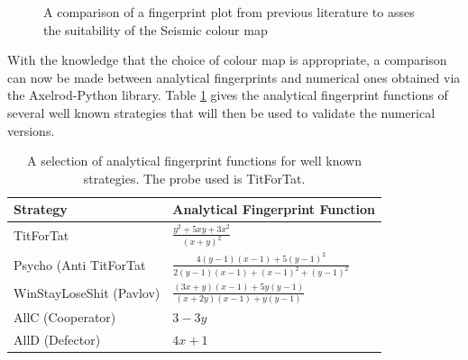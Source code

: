 \begin{figure}[hbtp!]
    \centering
    \caption{A comparison of a fingerprint plot from previous literature to asses the suitability of the Seismic colour map \cite{Ashlock2008}}
    \label{fig:WSLS-ashlock-comparison}
\end{figure}

With the knowledge that the choice of colour map is appropriate, a comparison can now be made between analytical fingerprints and numerical ones obtained via the Axelrod-Python library.
Table \ref{tab:fingerprint-functions} gives the analytical fingerprint functions of several well known strategies that will then be used to validate the numerical versions.

\begin{table}[htbp!]
\centering
\renewcommand{\arraystretch}{2}
\setlength{\tabcolsep}{12pt}
\begin{tabular}{l l}
\toprule
Strategy                 & Analytical Fingerprint Function\\
\midrule
TitForTat                & $\displaystyle \frac{y^2 + 5xy + 3x^2}{(x + y)^2} $\\
Psycho (Anti TitForTat   & $\displaystyle \frac{4(y-1)(x-1) + 5(y-1)^2}{2(y-1)(x-1) + (x-1)^2 + (y-1)^2} $ \\
WinStayLoseShit (Pavlov) & $\displaystyle \frac{(3x+y)(x-1) + 5y(y-1)}{(x+2y)(x-1) + y(y-1)} $\\
AllC (Cooperator)        & $\displaystyle 3 - 3y $ \\
AllD (Defector)          & $\displaystyle 4x + 1 $\\
\bottomrule
\end{tabular}
\caption{A selection of analytical fingerprint functions for well known strategies. The probe used is TitForTat.}
\label{tab:fingerprint-functions}
\end{table}

